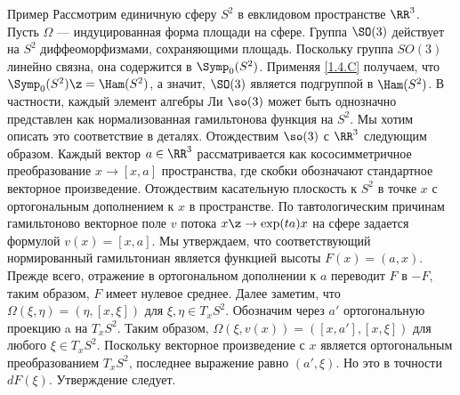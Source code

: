 \begin{thm}{Пример}\label{1.4.H}
Рассмотрим единичную сферу $S^2$ в евклидовом пространстве $\RR^3$.
Пусть $\Omega$ --- индуцированная форма площади на сфере.
Группа $\SO(3)$ действует на $S^2$ диффеоморфизмами, сохраняющими площадь.
Поскольку группа $SO(3)$ линейно связна, она содержится в $\Symp_0 (S^2)$.
Применяя \ref{1.4.C} получаем, что $\Symp_0 (S^2) \z= \Ham (S^2)$, а значит, $\SO (3)$ является подгруппой в $\Ham (S^2)$.
В частности, каждый элемент алгебры Ли $\so(3)$ может быть однозначно представлен как нормализованная гамильтонова функция на $S^2$.
Мы хотим описать это соответствие в деталях.
Отождествим $\so (3)$ с $\RR^3$ следующим образом.
Каждый вектор $a \in \RR^3$ рассматривается как кососимметричное преобразование $x \to [x, a]$ пространства, где скобки обозначают стандартное векторное произведение.
Отождествим касательную плоскость к $S^2$ в точке $x$ с ортогональным дополнением к $x$ в пространстве.
По тавтологическим причинам гамильтоново векторное поле $v$ потока $x \z\to \exp (ta) x$ на сфере задается формулой $v (x) = [x, a]$.
Мы утверждаем, что соответствующий нормированный гамильтониан является функцией высоты $F (x) = (a, x)$.
Прежде всего, отражение в ортогональном дополнении к $a$ переводит $F$ в $-F$, таким образом, $F$ имеет нулевое среднее.
Далее заметим, что $\Omega (\xi, \eta) = (\eta, [x, \xi])$ для $\xi, \eta \in T_x S^2$.
Обозначим через $a'$ ортогональную проекцию a на $T_x S^2$.
Таким образом, $\Omega (\xi, v(x)) = ([x, a'], [x, \xi])$ для любого $\xi \in T_x S^2$.
Поскольку векторное произведение с $x$ является ортогональным преобразованием $T_x S^2$, последнее выражение равно $(a', \xi)$.
Но это в точности $dF (\xi)$.
Утверждение следует.
\end{thm}
